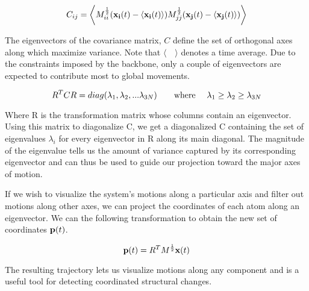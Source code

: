 \begin{equation}
C_{ij} = \bigg\langle M_{ii}^{\frac{1}{2}} (\mathbf{x_i}(t) - \langle \mathbf{x_i}(t) \rangle) M_{jj}^{\frac{1}{2}} (\mathbf{x_j}(t) - \langle \mathbf{x_j}(t) \rangle) \bigg\rangle
\end{equation}

The eigenvectors of the covariance matrix, $C$ define the set of orthogonal axes along which maximize variance. Note that $\langle \quad \rangle$ denotes a time average. Due to the constraints imposed by the backbone, only a couple of eigenvectors are expected to contribute most to global movements.

\begin{equation}
R^{T}CR = diag(\lambda_1, \lambda_2, ... \lambda_{3N}) \text{\qquad where \quad} \lambda_1 \geq \lambda_2 \geq \lambda_{3N}
\end{equation}

Where R is the transformation matrix whose columns contain an eigenvector. Using this matrix to diagonalize C, we get a diagonalized C containing the set of eigenvalues $\lambda_i$ for every eigenvector in R along its main diagonal. The magnitude of the eigenvalue tells us the amount of variance captured by its corresponding eigenvector and can thus be used to guide our projection toward the major axes of motion.

If we wish to visualize the system's motions along a particular axis and filter out motions along other axes, we can project the coordinates of each atom along an eigenvector. We can the following transformation to obtain the new set of coordinates $\mathbf{p}(t)$.

\begin{equation}
\mathbf{p}(t) = R^{T}M^{\frac{1}{2}}\mathbf{x}(t)
\end{equation}

The resulting trajectory lets us visualize motions along any component and is a useful tool for detecting coordinated structural changes. 

%
%
%


